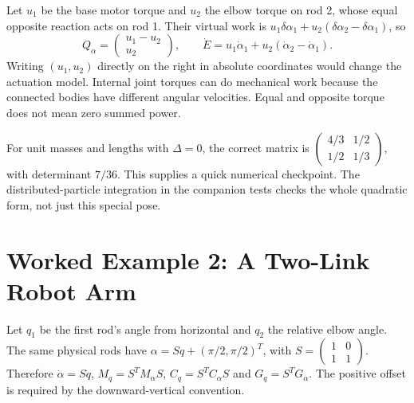 Let $u_1$ be the base motor torque and $u_2$ the elbow torque on rod 2, whose equal opposite reaction acts on rod 1. Their virtual work is $u_1\delta\alpha_1+u_2(\delta\alpha_2-\delta\alpha_1)$, so
\begin{equation}
Q_\alpha=\begin{pmatrix}u_1-u_2\\u_2\end{pmatrix},\qquad
\dot E=u_1\dot\alpha_1+u_2(\dot\alpha_2-\dot\alpha_1).
\label{eq:lagrangian_rods_motor_power}
\end{equation}
Writing $(u_1,u_2)$ directly on the right in absolute coordinates would change the actuation model. Internal joint torques can do mechanical work because the connected bodies have different angular velocities. Equal and opposite torque does not mean zero summed power.

For unit masses and lengths with $\Delta=0$, the correct matrix is $\left(\begin{smallmatrix}4/3&1/2\\1/2&1/3\end{smallmatrix}\right)$, with determinant $7/36$. This supplies a quick numerical checkpoint. The distributed-particle integration in the companion tests checks the whole quadratic form, not just this special pose.

\section{Worked Example 2: A Two-Link Robot Arm}
\label{sec:lagrangian_relative_arm}

Let $q_1$ be the first rod's angle from horizontal and $q_2$ the relative elbow angle. The same physical rods have $\alpha=S q+(\pi/2,\pi/2)^T$, with $S=\left(\begin{smallmatrix}1&0\\1&1\end{smallmatrix}\right)$. Therefore $\dot\alpha=S\dot q$, $M_q=S^TM_\alpha S$, $C_q=S^TC_\alpha S$ and $G_q=S^TG_\alpha$. The positive offset is required by the downward-vertical convention.

